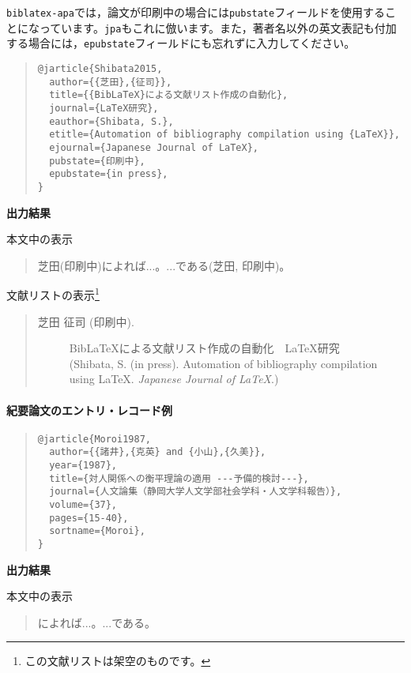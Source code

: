 \documentclass[12pt]{ltjsarticle}
\begin{document}
\texttt{biblatex-apa}では，論文が印刷中の場合には\texttt{pubstate}フィールドを使用することになっています。\texttt{jpa}もこれに倣います。また，著者名以外の英文表記も付加する場合には，\texttt{epubstate}フィールドにも忘れずに入力してください。

\begin{quote}
\begin{verbatim}
@jarticle{Shibata2015,
  author={{芝田},{征司}},
  title={{BibLaTeX}による文献リスト作成の自動化},
  journal={LaTeX研究},
  eauthor={Shibata, S.},
  etitle={Automation of bibliography compilation using {LaTeX}},
  ejournal={Japanese Journal of LaTeX},
  pubstate={印刷中},
  epubstate={in press},
}
\end{verbatim}
\end{quote}
\textcite{Shibata2015}

\textbf{出力結果}

本文中の表示
\begin{quote}
芝田(印刷中)によれば...。...である(芝田, 印刷中)。
\end{quote}


文献リストの表示\footnote{この文献リストは架空のものです。}
\begin{quote}
\begin{description}
  \item[\textrm{芝田 征司 (印刷中).}]{BibLaTeX}による文献リスト作成の自動化　LaTeX研究\\
(Shibata, S. (in press). Automation of bibliography compilation using LaTeX. \textit{Japanese Journal of LaTeX}.)
\end{description}
\end{quote}


\paragraph{紀要論文のエントリ・レコード例}

\begin{quote}
\begin{verbatim}
@jarticle{Moroi1987,
  author={{諸井},{克英} and {小山},{久美}},
  year={1987},
  title={対人関係への衡平理論の適用 ---予備的検討---},
  journal={人文論集（静岡大学人文学部社会学科・人文学科報告）},
  volume={37},
  pages={15-40},
  sortname={Moroi},
}
\end{verbatim}
\end{quote}


\textbf{出力結果}

本文中の表示
\begin{quote}
\textcite{Moroi1987}によれば...。...である\parencite{Moroi1987}。
\end{quote}
\end{document}
